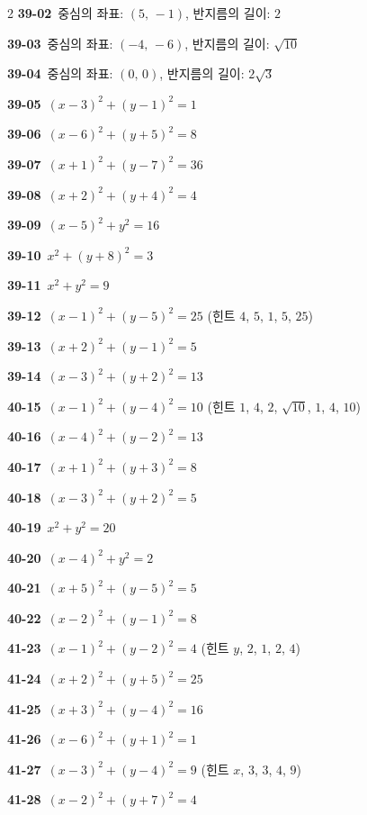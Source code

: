\documentclass[10pt,a4paper]{article}
\begin{document}
\begin{multicols}{2}
\noindent\textbf{39-02}\ 중심의 좌표: $(5,\,-1)$, 반지름의 길이: $2$\par
\noindent\textbf{39-03}\ 중심의 좌표: $(-4,\,-6)$, 반지름의 길이: $\sqrt{10}$\par
\noindent\textbf{39-04}\ 중심의 좌표: $(0,\,0)$, 반지름의 길이: $2\sqrt{3}$\par
\noindent\textbf{39-05}\ $(x-3)^2+(y-1)^2=1$\par
\noindent\textbf{39-06}\ $(x-6)^2+(y+5)^2=8$\par
\noindent\textbf{39-07}\ $(x+1)^2+(y-7)^2=36$\par
\noindent\textbf{39-08}\ $(x+2)^2+(y+4)^2=4$\par
\noindent\textbf{39-09}\ $(x-5)^2+y^2=16$\par
\noindent\textbf{39-10}\ $x^2+(y+8)^2=3$\par
\noindent\textbf{39-11}\ $x^2+y^2=9$\par
\noindent\textbf{39-12}\ $(x-1)^2+(y-5)^2=25$ (힌트 $4$, $5$, $1$, $5$, $25$)\par
\noindent\textbf{39-13}\ $(x+2)^2+(y-1)^2=5$\par
\noindent\textbf{39-14}\ $(x-3)^2+(y+2)^2=13$\par
\noindent\textbf{40-15}\ $(x-1)^2+(y-4)^2=10$ (힌트 $1$, $4$, $2$, $\sqrt{10}$, $1$, $4$, $10$)\par
\noindent\textbf{40-16}\ $(x-4)^2+(y-2)^2=13$\par
\noindent\textbf{40-17}\ $(x+1)^2+(y+3)^2=8$\par
\noindent\textbf{40-18}\ $(x-3)^2+(y+2)^2=5$\par
\noindent\textbf{40-19}\ $x^2+y^2=20$\par
\noindent\textbf{40-20}\ $(x-4)^2+y^2=2$\par
\noindent\textbf{40-21}\ $(x+5)^2+(y-5)^2=5$\par
\noindent\textbf{40-22}\ $(x-2)^2+(y-1)^2=8$\par
\noindent\textbf{41-23}\ $(x-1)^2+(y-2)^2=4$ (힌트 $y$, $2$, $1$, $2$, $4$)\par
\noindent\textbf{41-24}\ $(x+2)^2+(y+5)^2=25$\par
\noindent\textbf{41-25}\ $(x+3)^2+(y-4)^2=16$\par
\noindent\textbf{41-26}\ $(x-6)^2+(y+1)^2=1$\par
\noindent\textbf{41-27}\ $(x-3)^2+(y-4)^2=9$ (힌트 $x$, $3$, $3$, $4$, $9$)\par
\noindent\textbf{41-28}\ $(x-2)^2+(y+7)^2=4$\par

\end{multicols}
\end{document}
